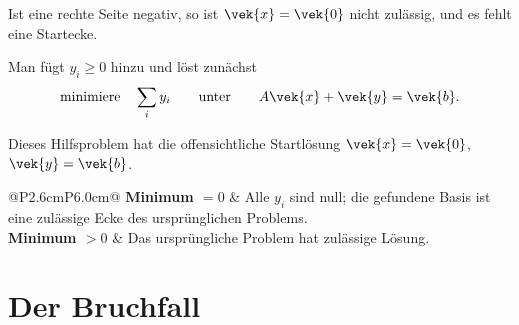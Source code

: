 \begin{merksatz}
Ist eine rechte Seite negativ, so ist $\vek{x}=\vek{0}$ nicht zulässig, und es fehlt eine Startecke.

Man fügt  $y_i \ge 0$ hinzu und löst zunächst
\[ \text{minimiere}\quad \sum_i y_i \qquad\text{unter}\qquad A\vek{x} + \vek{y} = \vek{b} . \]

Dieses Hilfsproblem hat die offensichtliche Startlösung $\vek{x}=\vek{0}$, $\vek{y}=\vek{b}$.

\begin{center}
\renewcommand{\arraystretch}{1.5}
\begin{tabular}{@{}P{2.6cm}P{6.0cm}@{}}
\toprule
\textbf{Minimum $=0$} & Alle $y_i$ sind null; die gefundene Basis ist eine zulässige Ecke des ursprünglichen Problems.\\
\textbf{Minimum $>0$} & Das ursprüngliche Problem hat  zulässige Lösung.\\
\bottomrule
\end{tabular}
\end{center}

\begin{center}
\begin{minipage}{0.88\textwidth}
\end{minipage}
\end{center}
\end{merksatz}

\section{Der Bruchfall}

